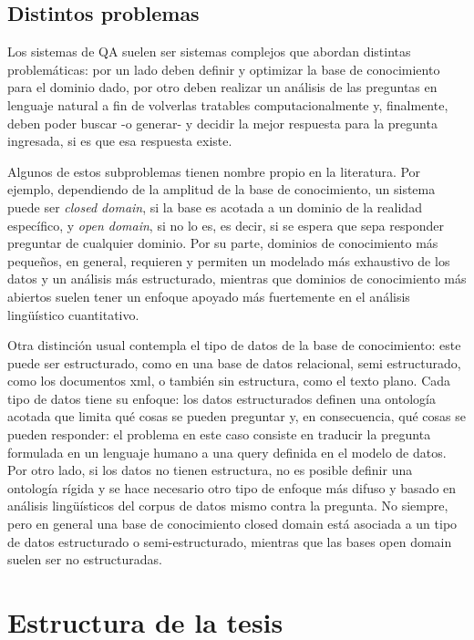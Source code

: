 \subsection{Distintos problemas}

Los sistemas de QA suelen ser sistemas complejos que abordan distintas
problemáticas: por un lado deben definir y optimizar la base de
conocimiento para el dominio dado, por otro deben realizar un
análisis de las preguntas en lenguaje natural a fin de volverlas
tratables computacionalmente y, finalmente, deben poder buscar -o generar- y
decidir la mejor respuesta para la pregunta ingresada, si es que esa
respuesta existe.


\bigskip

Algunos de estos subproblemas tienen nombre propio en la literatura. Por
ejemplo, dependiendo de la amplitud de la base de conocimiento, un
sistema puede ser \textit{closed domain}, si la base es acotada a un dominio de la realidad específico, y
\textit{open domain}, si no lo es, es decir, si se espera que sepa responder preguntar de cualquier dominio.
Por su parte, dominios de conocimiento más pequeños, en general, requieren y permiten un modelado más exhaustivo
de los datos y un análisis más estructurado, mientras que dominios de conocimiento más abiertos suelen
tener un enfoque apoyado más fuertemente en el análisis lingüístico cuantitativo.


\bigskip

Otra distinción usual contempla el tipo de datos de la base de
conocimiento: este puede ser estructurado, como en una base de datos
relacional, semi estructurado, como los documentos xml, o también sin
estructura, como el texto plano. Cada tipo de datos tiene su enfoque:
los datos estructurados definen una ontología acotada que limita
qué cosas se pueden preguntar y, en consecuencia, qué cosas se pueden responder: el
problema en este caso consiste en traducir la pregunta formulada en un lenguaje humano a una query
definida en el modelo de datos. Por otro lado, si los datos no
tienen estructura, no es posible definir una ontología rígida y se
hace necesario otro tipo de enfoque más difuso y basado en análisis
lingüísticos del corpus de datos mismo contra la pregunta. No siempre, 
pero en general una base de conocimiento closed domain está asociada
a un tipo de datos estructurado o semi-estructurado, mientras que las bases open domain
suelen ser no estructuradas.


\section{Estructura de la tesis}

